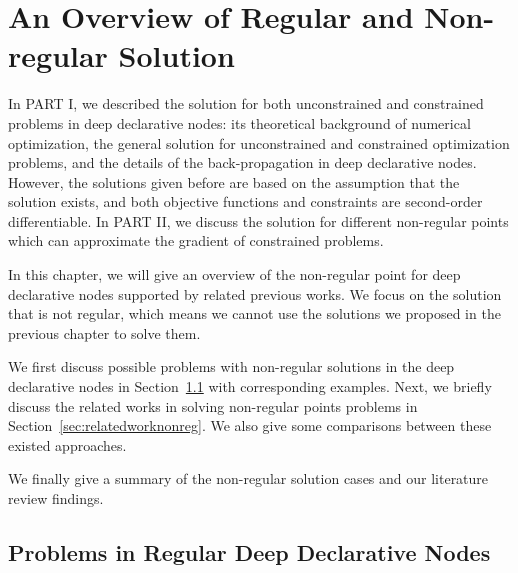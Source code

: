 \chapter{An Overview of Regular and Non-regular Solution}
\label{cha:overviewpart2}
In PART I, we described the solution for both unconstrained and constrained problems in deep declarative nodes: its theoretical background of numerical optimization, the general solution for unconstrained and constrained optimization problems, and the details of the back-propagation in deep declarative nodes. However, the solutions given before are based on the assumption that the solution exists, and both objective functions and constraints are second-order differentiable. In PART II, we discuss the solution for different non-regular points which can approximate the gradient of constrained problems. 
\par In this chapter, we will give an overview of the non-regular point for deep declarative nodes supported by related previous works. We focus on the solution that is not regular, which means we cannot use the solutions we proposed in the previous chapter to solve them. 
\par We first discuss possible problems with non-regular solutions in the deep declarative nodes in Section~\ref{sec:problems-in-non-regular} with corresponding examples. Next, we briefly discuss the related works in solving non-regular points problems in Section~\ref{sec:relatedworknonreg}. We also give some comparisons between these existed approaches. 
\par We finally give a summary of the non-regular solution cases and our literature review findings. 


\section{Problems in Regular Deep Declarative Nodes}
\label{sec:problems-in-non-regular}

